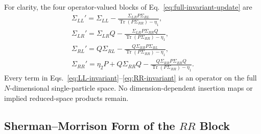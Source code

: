 \documentclass[aps,prb,onecolumn,nofootinbib,superscriptaddress]{revtex4-2}
\newcommand{\Tr}{\operatorname{Tr}}
\theoremstyle{plain}
\theoremstyle{definition}
\begin{document}
For clarity, the four operator-valued blocks of
Eq.~\eqref{eq:full-invariant-update} are
\begin{align}
  \boxed{
  \Sigma_{LL}'
  =
  \Sigma_{LL}
  -
  \frac{\Sigma_{LR}P\Sigma_{RL}}
       {\Tr(P\Sigma_{RR})-\eta_1}
  },
  \label{eq:LL-invariant}
  \\[5pt]
  \boxed{
  \Sigma_{LR}'
  =
  \Sigma_{LR}Q
  -
  \frac{\Sigma_{LR}P\Sigma_{RR}Q}
       {\Tr(P\Sigma_{RR})-\eta_1}
  },
  \label{eq:LR-invariant}
  \\[5pt]
  \boxed{
  \Sigma_{RL}'
  =
  Q\Sigma_{RL}
  -
  \frac{Q\Sigma_{RR}P\Sigma_{RL}}
       {\Tr(P\Sigma_{RR})-\eta_1}
  },
  \label{eq:RL-invariant}
  \\[5pt]
  \boxed{
  \Sigma_{RR}'
  =
  \eta_2P
  +
  Q\Sigma_{RR}Q
  -
  \frac{Q\Sigma_{RR}P\Sigma_{RR}Q}
       {\Tr(P\Sigma_{RR})-\eta_1}
  }.
  \label{eq:RR-invariant}
\end{align}
Every term in Eqs.~\eqref{eq:LL-invariant}--\eqref{eq:RR-invariant} is an
operator on the full \(N\)-dimensional single-particle space.  No
dimension-dependent insertion maps or implied reduced-space products remain.

\subsection{Sherman--Morrison Form of the \texorpdfstring{$RR$}{RR} Block}
\label{subsec:SM-RR}
\end{document}
